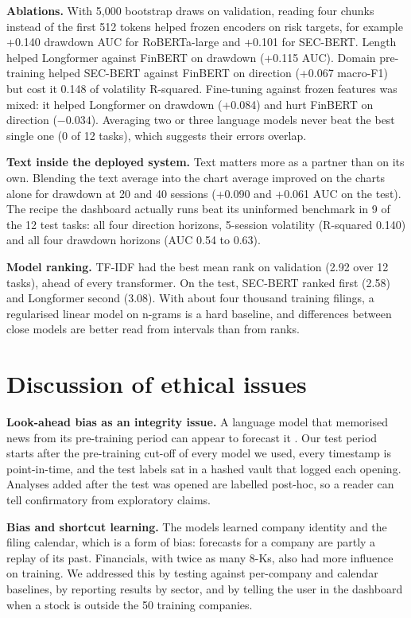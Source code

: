 \documentclass[11pt,a4paper]{article}
\begin{document}
\textbf{Ablations.} With 5,000 bootstrap draws on validation, reading four chunks instead of the first 512 tokens helped frozen encoders on risk targets, for example +0.140 drawdown AUC for RoBERTa-large and +0.101 for SEC-BERT. Length helped Longformer against FinBERT on drawdown (+0.115 AUC). Domain pre-training helped SEC-BERT against FinBERT on direction (+0.067 macro-F1) but cost it 0.148 of volatility R-squared. Fine-tuning against frozen features was mixed: it helped Longformer on drawdown (+0.084) and hurt FinBERT on direction ($-0.034$). Averaging two or three language models never beat the best single one (0 of 12 tasks), which suggests their errors overlap.

\textbf{Text inside the deployed system.} Text matters more as a partner than on its own. Blending the text average into the chart average improved on the charts alone for drawdown at 20 and 40 sessions (+0.090 and +0.061 AUC on the test). The recipe the dashboard actually runs beat its uninformed benchmark in 9 of the 12 test tasks: all four direction horizons, 5-session volatility (R-squared 0.140) and all four drawdown horizons (AUC 0.54 to 0.63).

\textbf{Model ranking.} TF-IDF had the best mean rank on validation (2.92 over 12 tasks), ahead of every transformer. On the test, SEC-BERT ranked first (2.58) and Longformer second (3.08). With about four thousand training filings, a regularised linear model on n-grams is a hard baseline, and differences between close models are better read from intervals than from ranks.

\section{Discussion of ethical issues}

\textbf{Look-ahead bias as an integrity issue.} A language model that memorised news from its pre-training period can appear to forecast it \cite{glasserman2023,sarkar2024}. Our test period starts after the pre-training cut-off of every model we used, every timestamp is point-in-time, and the test labels sat in a hashed vault that logged each opening. Analyses added after the test was opened are labelled post-hoc, so a reader can tell confirmatory from exploratory claims.

\textbf{Bias and shortcut learning.} The models learned company identity and the filing calendar, which is a form of bias: forecasts for a company are partly a replay of its past. Financials, with twice as many 8-Ks, also had more influence on training. We addressed this by testing against per-company and calendar baselines, by reporting results by sector, and by telling the user in the dashboard when a stock is outside the 50 training companies.
\end{document}
